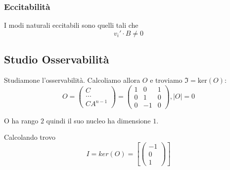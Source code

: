 \documentclass{article}
\begin{document}
\subsubsection{Eccitabilità}
 I modi naturali eccitabili sono quelli tali che 
\[v_i' \cdot B \neq 0\]

\subsection{Studio Osservabilità}

Studiamone l'osservabilità. Calcoliamo allora $O$ e troviamo $\mathfrak{I} = \text{ker}(O)$:
\[
 O = \begin{pmatrix}C \\ ... \\ CA^{n-1}  \end{pmatrix} = \left(\begin{matrix}1 & 0 & 1\\0 & 1 & 0\\0 & -1 & 0\end{matrix}\right), |O| = 0 \]

O ha rango $ 2 $ quindi il suo nucleo ha dimensione $ 1 $.

Calcolando trovo \[ 
I = ker(O) = \left[ \left(\begin{matrix}-1\\0\\1\end{matrix}\right)\right]\]
\end{document}
